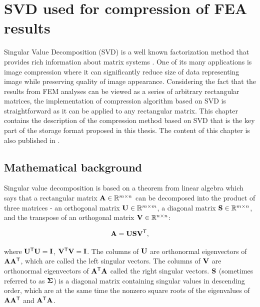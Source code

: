 \chapter{SVD used for compression of FEA results}
\label{chapter:SVD}

Singular Value Decomposition (SVD) is a well known factorization method that provides rich information about matrix systems \cite{Baker2005, Kalman1996, Golub1996, Duintjer2012}. One of its many applications is image compression where it can significantly reduce size of data representing image while preserving quality of image appearance. Considering the fact that the results from FEM analyses can be viewed as a series of arbitrary rectangular matrices, the implementation of compression algorithm based on SVD is straightforward as it can be applied to any rectangular matrix. This chapter contains the description of the compression method based on SVD that is the key part of the storage format proposed in this thesis. The content of this chapter is also published in \cite{Benes2018}.


\section{Mathematical background}

Singular value decomposition is based on a theorem from linear algebra which says that a rectangular matrix $\mathbf{A} \in \mathbb{R}^{m \times n}$ can be decomposed into the product of three matrices - an orthogonal matrix $\mathbf{U} \in \mathbb{R}^{m \times m}$, a diagonal
matrix $\mathbf{S} \in \mathbb{R}^{m \times n}$, and the transpose of an orthogonal matrix $\mathbf{V} \in \mathbb{R}^{n \times n}$:

\begin{equation}
\mathbf{A} = \mathbf{U} \mathbf{S} \mathbf{V}^\mathsf{T},
\label{eq:svd-def}
\end{equation}

\noindent
where $\mathbf{U^\mathsf{T}U} = \mathbf{I}$, $\mathbf{V^\mathsf{T}V} = \mathbf{I}$. The columns of $\mathbf{U}$ are orthonormal eigenvectors of $\mathbf{AA^\mathsf{T}}$, which are called the left singular vectors. The columns of $\mathbf{V}$ are orthonormal eigenvectors of $\mathbf{A^\mathsf{T}A}$ called the right singular vectors. $\mathbf{S}$ (sometimes referred to as $\mathbf{\Sigma}$) is a diagonal matrix containing singular values in descending order, which are at the same time the nonzero square roots of the eigenvalues of $\mathbf{AA^\mathsf{T}}$ and $\mathbf{A^\mathsf{T}A}$.

